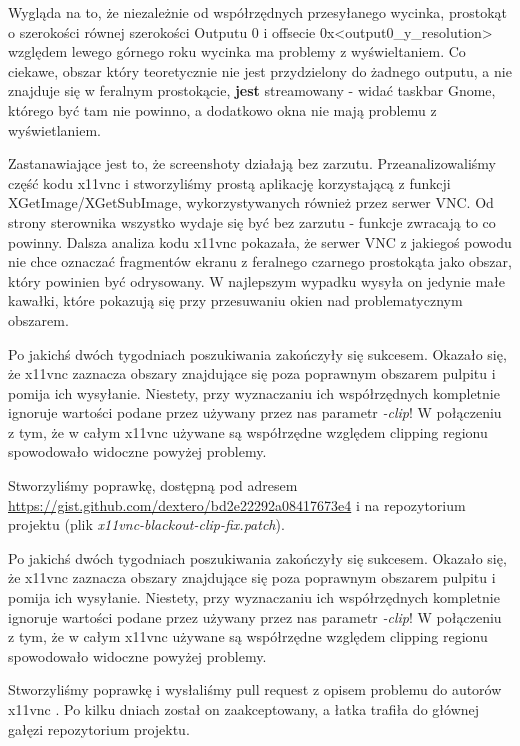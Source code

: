     Wygląda na to, że niezależnie od współrzędnych przesyłanego wycinka, prostokąt o szerokości równej szerokości Outputu 0 i offsecie 0x<output0\_y\_resolution> względem lewego górnego roku wycinka ma problemy z wyświeltaniem. Co ciekawe, obszar który teoretycznie nie jest przydzielony do żadnego outputu, a nie znajduje się w feralnym prostokącie, \textbf{jest} streamowany - widać taskbar Gnome, którego być tam nie powinno, a dodatkowo okna nie mają problemu z wyświetlaniem.

    \vfill

    Zastanawiające jest to, że screenshoty działają bez zarzutu. Przeanalizowaliśmy część kodu x11vnc i stworzyliśmy prostą aplikację korzystającą z funkcji XGetImage/XGetSubImage, wykorzystywanych również przez serwer VNC. Od strony sterownika wszystko wydaje się być bez zarzutu - funkcje zwracają to co powinny. Dalsza analiza kodu x11vnc pokazała, że serwer VNC z jakiegoś powodu nie chce oznaczać fragmentów ekranu z feralnego czarnego prostokąta jako obszar, który powinien być odrysowany. W najlepszym wypadku wysyła on jedynie małe kawałki, które pokazują się przy przesuwaniu okien nad problematycznym obszarem.

    Po jakichś dwóch tygodniach poszukiwania zakończyły się sukcesem. Okazało się, że x11vnc zaznacza obszary znajdujące się poza poprawnym obszarem pulpitu i pomija ich wysyłanie. Niestety, przy wyznaczaniu ich współrzędnych kompletnie ignoruje wartości podane przez używany przez nas parametr \emph{-clip}! W połączeniu z tym, że w całym x11vnc używane są współrzędne względem clipping regionu spowodowało widoczne powyżej problemy.

    Stworzyliśmy poprawkę, dostępną pod adresem \url{https://gist.github.com/dextero/bd2e22292a08417673e4} i na repozytorium projektu (plik \emph{x11vnc-blackout-clip-fix.patch}).

    Po jakichś dwóch tygodniach poszukiwania zakończyły się sukcesem. Okazało się, że x11vnc zaznacza obszary znajdujące się poza poprawnym obszarem pulpitu i pomija ich wysyłanie. Niestety, przy wyznaczaniu ich współrzędnych kompletnie ignoruje wartości podane przez używany przez nas parametr \emph{-clip}! W połączeniu z tym, że w całym x11vnc używane są współrzędne względem clipping regionu spowodowało widoczne powyżej problemy.

    Stworzyliśmy poprawkę \cite{x11vncPatch} i wysłaliśmy pull request z opisem problemu do autorów x11vnc \cite{x11vncPullRequest}. Po kilku dniach został on zaakceptowany, a łatka trafiła do głównej gałęzi repozytorium projektu.

